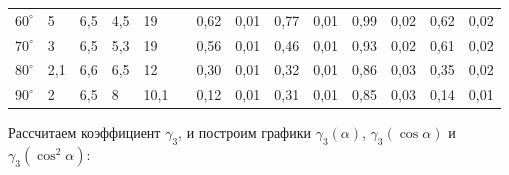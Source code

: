 \documentclass[a4paper,12pt]{report}
\begin{document}
\begin{table}[H]
\begin{center}
\begin{tabular}{|p{0.39cm}|p{0.6cm}|p{0.6cm}|p{0.6cm}|p{0.6cm}|c|c|c|c|c|c|c|c|c|}
$60^{\circ}$    & 5       & 6,5     & 4,5     & 19      &                        & 0,62  & 0,01        & 0,77  & 0,01        & 0,99         & 0,02               & 0,62         & 0,02               \\ \cline{1-5} \cline{7-14} 
$70^{\circ}$    & 3       & 6,5     & 5,3     & 19      &                        & 0,56  & 0,01        & 0,46  & 0,01        & 0,93         & 0,02               & 0,61         & 0,02               \\ \cline{1-5} \cline{7-14} 
$80^{\circ}$    & 2,1     & 6,6     & 6,5     & 12      &                        & 0,30  & 0,01        & 0,32  & 0,01        & 0,86         & 0,03               & 0,35         & 0,02               \\ \cline{1-5} \cline{7-14} 
$90^{\circ}$    & 2       & 6,5     & 8       & 10,1    &                        & 0,12  & 0,01        & 0,31  & 0,01        & 0,85         & 0,03               & 0,14         & 0,01               \\ \hline
\end{tabular}
\end{center}
\end{table}

Рассчитаем коэффициент $ \gamma_3$, и построим графики $ \gamma_3(\alpha) $, $ \gamma_3(\cos\alpha) $ и $ \gamma_3(\cos^2\alpha) $:
\end{document}
